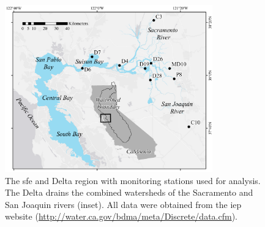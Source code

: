 \documentclass[journal = esthag, manuscript = article]{achemso}\usepackage[]{graphicx}\usepackage[]{color}
\begin{document}
\begin{figure}
\centering
\includegraphics[width=0.8\textwidth,page=1]{figs/delt_map.pdf}
\caption{The \acl{sfe} and Delta region with monitoring stations used for analysis. The Delta drains the combined watersheds of the Sacramento and San Joaquin rivers (inset). All data were obtained from the \acl{iep} website (\url{http://water.ca.gov/bdma/meta/Discrete/data.cfm})\cite{IEP13}.}
\label{fig:delt_map}   
\end{figure}
\end{document}
